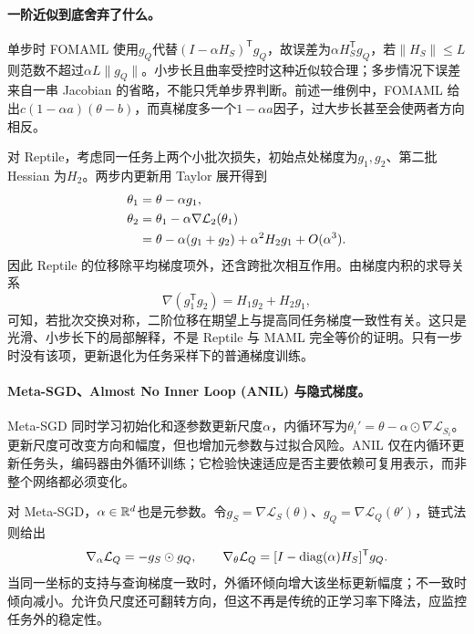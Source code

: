 \paragraph{一阶近似到底舍弃了什么。}
单步时 FOMAML 使用$g_Q$代替$(I-\alpha H_S)^{\mathsf T}g_Q$，故误差为$\alpha H_S^{\mathsf T}g_Q$，若$\|H_S\|\leq L$则范数不超过$\alpha L\|g_Q\|$。小步长且曲率受控时这种近似较合理；多步情况下误差来自一串 Jacobian 的省略，不能只凭单步界判断。前述一维例中，FOMAML 给出$c(1-\alpha a)(\theta-b)$，而真梯度多一个$1-\alpha a$因子，过大步长甚至会使两者方向相反。

对 Reptile，考虑同一任务上两个小批次损失，初始点处梯度为$g_1,g_2$、第二批 Hessian 为$H_2$。两步内更新用 Taylor 展开得到
\begin{align}
 \theta_1&=\theta-\alpha g_1,\\
 \theta_2&=\theta_1-\alpha\nabla\mathcal L_2(\theta_1)\notag\\
 &=\theta-\alpha(g_1+g_2)+\alpha^2H_2g_1+O(\alpha^3).
\end{align}
因此 Reptile 的位移除平均梯度项外，还含跨批次相互作用。由梯度内积的求导关系
\begin{equation*}
 \nabla(g_1^{\mathsf T}g_2)=H_1g_2+H_2g_1,
\end{equation*}
可知，若批次交换对称，二阶位移在期望上与提高同任务梯度一致性有关。这只是光滑、小步长下的局部解释，不是 Reptile 与 MAML 完全等价的证明。只有一步时没有该项，更新退化为任务采样下的普通梯度训练。

\paragraph{Meta-SGD、Almost No Inner Loop (ANIL) 与隐式梯度。}
Meta-SGD 同时学习初始化和逐参数更新尺度$\alpha$，内循环写为$\theta_i'=\theta-\alpha\odot\nabla\mathcal L_{S_i}$\cite{li2017metasgd}。更新尺度可改变方向和幅度，但也增加元参数与过拟合风险。ANIL 仅在内循环更新任务头，编码器由外循环训练\cite{raghu2020anil}；它检验快速适应是否主要依赖可复用表示，而非整个网络都必须变化。

对 Meta-SGD，$\alpha\in\mathbb{R}^d$也是元参数。令$g_S=\nabla\mathcal L_S(\theta)$、$g_Q=\nabla\mathcal L_Q(\theta')$，链式法则给出
\begin{equation}
 \nabla_\alpha\mathcal L_Q=-g_S\odot g_Q,\qquad
 \nabla_\theta\mathcal L_Q=
 [I-\operatorname{diag}(\alpha)H_S]^{\mathsf T}g_Q.
\end{equation}
当同一坐标的支持与查询梯度一致时，外循环倾向增大该坐标更新幅度；不一致时倾向减小。允许负尺度还可翻转方向，但这不再是传统的正学习率下降法，应监控任务外的稳定性。

